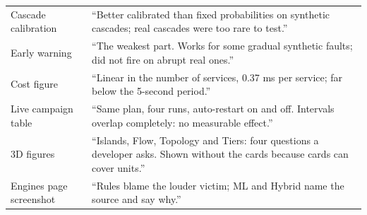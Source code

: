 \begin{center}
\begin{tabularx}{\textwidth}{>{\raggedright\arraybackslash}p{3.4cm}>{\raggedright\arraybackslash}X}
Cascade calibration & ``Better calibrated than fixed probabilities on synthetic cascades; real cascades were too rare to test.''\\
Early warning & ``The weakest part. Works for some gradual synthetic faults; did not fire on abrupt real ones.''\\
Cost figure & ``Linear in the number of services, 0.37 ms per service; far below the 5-second period.''\\
Live campaign table & ``Same plan, four runs, auto-restart on and off. Intervals overlap completely: no measurable effect.''\\
3D figures & ``Islands, Flow, Topology and Tiers: four questions a developer asks. Shown without the cards because cards can cover units.''\\
Engines page screenshot & ``Rules blame the louder victim; ML and Hybrid name the source and say why.''\\
\bottomrule
\end{tabularx}
\end{center}
